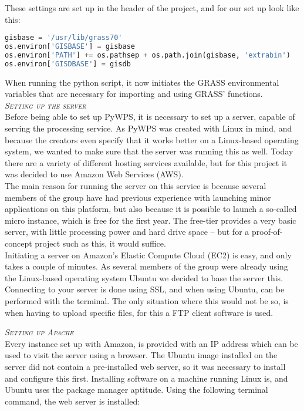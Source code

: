 These settings are set up in the header of the project, and for our set up look like this:

\begin{lstlisting}[language=Python]
gisbase = '/usr/lib/grass70'
os.environ['GISBASE'] = gisbase
os.environ['PATH'] += os.pathsep + os.path.join(gisbase, 'extrabin')
os.environ['GISDBASE'] = gisdb
\end{lstlisting}

When running the python script, it now initiates the GRASS environmental variables that are necessary for importing and using GRASS' functions.\\

\textsc{\textit{Setting up the server}} \\

Before being able to set up PyWPS, it is necessary to set up a server, capable of serving the processing service.  
As PyWPS was created with Linux in mind, and because the creators even specify that it works better on a Linux-based operating system, we wanted to make sure that the server was running this as well. Today there are a variety of different hosting services available, but for this project it was decided to use Amazon Web Services (AWS).\\

The main reason for running the server on this service is because several members of the group have had previous experience with launching minor applications on this platform, but also because it is possible to launch a so-called micro instance, which is free for the first year. The free-tier provides a very basic server, with little processing power and hard drive space – but for a proof-of-concept project such as this, it would suffice. \\
Initiating a server on Amazon's Elastic Compute Cloud (EC2) is easy, and only takes a couple of minutes. As several members of the group were already using the Linux-based operating system Ubuntu we decided to base the server this.\\
Connecting to your server is done using SSL, and when using Ubuntu, can be performed with the terminal. The only situation where this would not be so, is when having to upload specific files, for this a FTP client software is used.

\textsc{\textit{Setting up Apache}}\\

Every instance set up with Amazon, is provided with an IP address which can be used to visit the server using a browser. The Ubuntu image installed on the server did not contain a pre-installed web server, so it was necessary to install and configure this first.
Installing software on a machine running Linux is, and Ubuntu uses the package manager aptitude. Using the following terminal command, the web server is installed:


